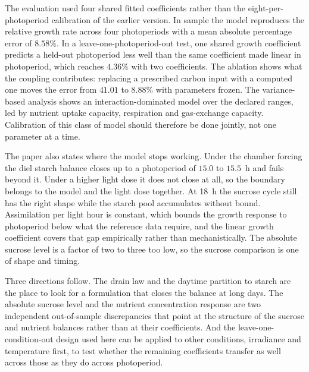 The evaluation used four shared fitted coefficients rather than the
eight-per-photoperiod calibration of the earlier version. In sample the model
reproduces the relative growth rate across four photoperiods with a mean
absolute percentage error of $8.58\%$. In a leave-one-photoperiod-out test, one
shared growth coefficient predicts a held-out photoperiod less well than the
same coefficient made linear in photoperiod, which reaches $4.36\%$ with two
coefficients. The ablation shows what the coupling contributes: replacing a
prescribed carbon input with a computed one moves the error from $41.01$ to
$8.88\%$ with parameters frozen. The variance-based analysis shows an
interaction-dominated model over the declared ranges, led by nutrient uptake
capacity, respiration and gas-exchange capacity. Calibration of this class of
model should therefore be done jointly, not one parameter at a time.

The paper also states where the model stops working. Under the chamber forcing the diel
starch balance closes up to a photoperiod of $15.0$ to $15.5$~h and fails
beyond it. Under a higher light dose it does not close at all, so the boundary
belongs to the model and the light dose together. At 18~h the sucrose
cycle still has the right shape while the starch pool accumulates without
bound. Assimilation per light hour is constant, which bounds the growth
response to photoperiod below what the reference data require, and the linear
growth coefficient covers that gap empirically rather than mechanistically. The
absolute sucrose level is a factor of two to three too low, so the sucrose
comparison is one of shape and timing.

Three directions follow. The drain law and the daytime partition to starch are
the place to look for a formulation that closes the balance at long days.
The absolute sucrose level and the nutrient concentration response are two
independent out-of-sample discrepancies that point at the structure of the
sucrose and nutrient balances rather than at their coefficients. And the
leave-one-condition-out design used here can be applied to other conditions,
irradiance and temperature first, to test whether the remaining coefficients
transfer as well across those as they do across photoperiod.
